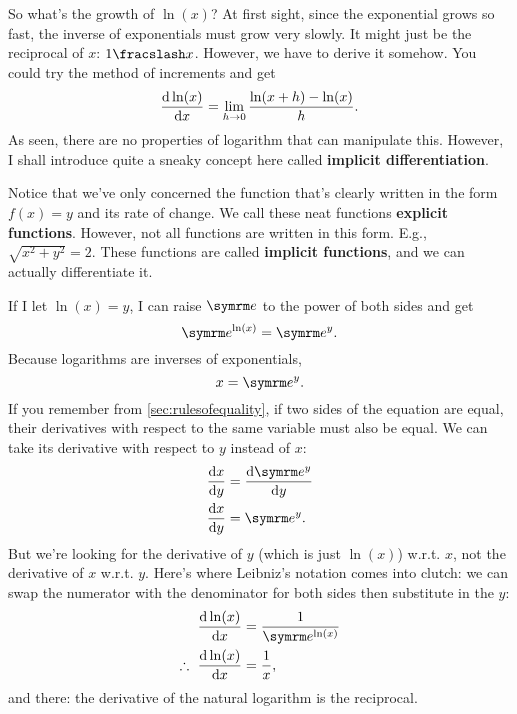 So what's the growth of $\ln(x)$? At first sight, since the exponential grows so fast, the inverse of exponentials must grow very slowly. It might just be the reciprocal of $x$: $\flatfrac{1}{x}$. However, we have to derive it somehow. You could try the method of increments and get
\begin{equation}
    \odv{\ln(x)}{x} = \lim_{h \appr 0}\frac{\ln(x + h) - \ln(x)}{h}.
\end{equation}
As seen, there are no properties of logarithm that can manipulate this. However, I shall introduce quite a sneaky concept here called \textbf{implicit differentiation}.

Notice that we've only concerned the function that's clearly written in the form $f(x) = y$ and its rate of change. We call these neat functions \textbf{explicit functions}. However, not all functions are written in this form. E.g., $\sqrt{x^2 + y^2} = 2$. These functions are called \textbf{implicit functions}, and we can actually differentiate it.

If I let $\ln(x) = y$, I can raise $\e$ to the power of both sides and get
\begin{equation}
    \e^{\ln(x)} = \e^y.
\end{equation}
Because logarithms are inverses of exponentials,
\begin{equation}
    x = \e^y.
\end{equation}
If you remember from \cref{sec:rulesofequality}, if two sides of the equation are equal, their derivatives with respect to the same variable must also be equal. We can take its derivative with respect to $y$ instead of $x$:
\begin{align*}
    \odv{x}{y} &= \odv{\e^y}{y} \\
    \odv{x}{y} &= \e^y.
\end{align*}
But we're looking for the derivative of $y$ (which is just $\ln(x)$) w.r.t. $x$, not the derivative of $x$ w.r.t. $y$. Here's where Leibniz's notation comes into clutch: we can swap the numerator with the denominator for both sides then substitute in the $y$:
\begin{align*}
    \odv{\ln(x)}{x} &= \frac{1}{\e^{\ln(x)}} \\
    \therefore~\odv{\ln(x)}{x} &= \frac{1}{x},
\end{align*}
and there: the derivative of the natural logarithm is the reciprocal.

